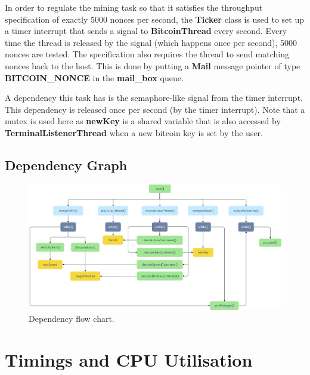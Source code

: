 \documentclass{article}
\begin{document}
\bigskip

In order to regulate the mining task so that it satisfies the throughput specification of exactly 5000 nonces per second, the \textbf{Ticker} class is used to set up a timer interrupt that sends a signal to \textbf{BitcoinThread} every second. Every time the thread is released by the signal (which happens once per second), 5000 nonces are tested. The specification also requires the thread to send matching nonces back to the host. This is done by putting a \textbf{Mail} message pointer of type \textbf{BITCOIN\_NONCE} in the \textbf{mail\_box} queue. 

\bigskip



\bigskip

A dependency this task has is the semaphore-like signal from the timer interrupt. This dependency is released once per second (by the timer interrupt). Note that a mutex is used here as \textbf{newKey} is a shared variable that is also accessed by \textbf{TerminalListenerThread} when a new bitcoin key is set by the user. 


\subsection{Dependency Graph}

\begin{figure}[H]
\begin{center}
   \includegraphics[width=0.9\linewidth]{dependency.png}
\end{center}
   \caption{Dependency flow chart.}
\label{fig:long}
\label{fig:onecol}
\end{figure}

\section{Timings and CPU Utilisation}
\end{document}
